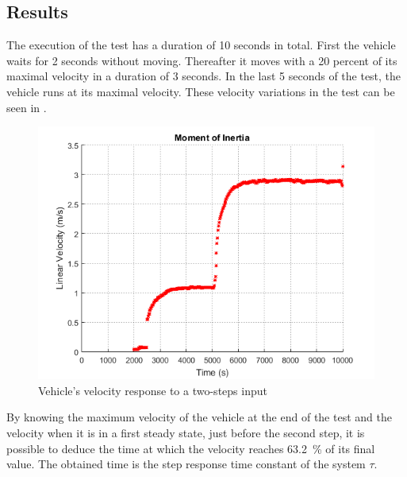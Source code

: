\subsection{Results} \label{inertiaTestResults}
The execution of the test has a duration of 10 seconds in total. First the vehicle waits for 2 seconds without moving. Thereafter it moves with a 20 percent of its maximal velocity in a duration of 3 seconds. In the last 5 seconds of the test, the vehicle runs at its maximal velocity. These velocity variations in the test can be seen in .

\begin{figure}[H]
  \centering
  \includegraphics[scale=0.8]{figures/VehicleMomentOfInertiaTest.png}
  \caption{Vehicle's velocity response to a two-steps input}
  \label{MomentOfInertiaTestPlot}
\end{figure}

By knowing the maximum velocity of the vehicle at the end of the test and the velocity when it is in a first steady state, just before the second step, it is possible to deduce the time at which the velocity reaches \si{\num{63.2} \%} of its final value. The obtained time is the step response time constant of the system $\tau$.

